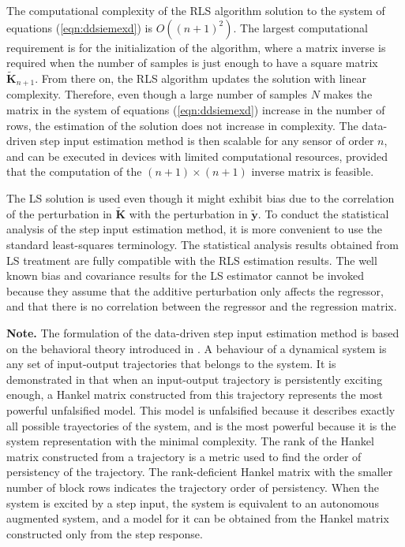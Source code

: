 The computational complexity of the RLS algorithm solution to the system of equations (\ref{eqn:ddsiemexd}) is $O \left( \left( n+1 \right)^2 \right)$.
The largest computational requirement is for the initialization of the algorithm, where a matrix inverse is required when the number of samples is just enough to have a square matrix $\widetilde{\mathbf{K}}_{n+1}$.
From there on, the RLS algorithm updates the solution with linear complexity.
Therefore, even though a large number of samples $N$ makes the matrix in the system of equations (\ref{eqn:ddsiemexd}) increase in the number of rows, the estimation of the solution does not increase in complexity. 
The data-driven step input estimation method is then scalable for any sensor of order $n$, and can be executed in devices with limited computational resources, provided that the computation of the  $(n+1) \times (n+1)$ inverse matrix is feasible.
\color{black}	

The LS solution is used even though it might exhibit bias due to the correlation of the perturbation in $\widetilde{\mathbf{K}}$ with the perturbation in $\widetilde{\mathbf{y}}$.
To conduct the statistical analysis of the step input estimation method, it is more convenient to use the standard least-squares terminology.
The statistical analysis results obtained from LS treatment are fully compatible with the RLS estimation results.
The well known bias and covariance results for the LS estimator cannot be invoked because they assume that the additive perturbation only affects the regressor, and that there is no correlation between the regressor and the regression matrix.

\color{blue}
{\bfseries Note.} The formulation of the data-driven step input estimation method is based on the behavioral theory introduced in \citet{Willems86I}.
A behaviour of a dynamical system is any set of input-output trajectories that belongs to the system. 
It is demonstrated in \citet{Willems05} that when an input-output trajectory is persistently exciting enough, a Hankel matrix constructed from this trajectory represents the most powerful unfalsified model.
This model is unfalsified because it describes exactly all possible trayectories of the system, and is the most powerful because it is the system representation with the minimal complexity.     
The rank of the Hankel matrix constructed from a trajectory is a metric used to find the order of persistency of the trajectory.
The rank-deficient Hankel matrix with the smaller number of block rows indicates the trajectory order of persistency. %
When the system is excited by a step input, the system is equivalent to an autonomous augmented system, and a model for it can be obtained from the Hankel matrix constructed only from the step response.  

